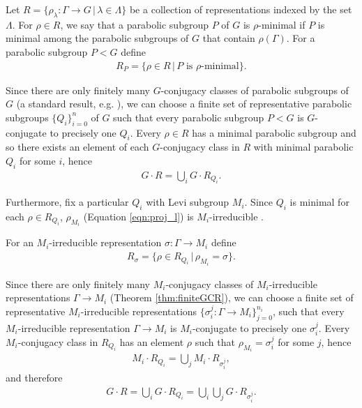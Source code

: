 Let $R = \{ \rho_\lambda : \Gamma \rightarrow G \,|\, \lambda \in \Lambda \}$ be a collection of representations indexed by the set $\Lambda$. For $\rho \in R$, we say that a parabolic subgroup $P$ of $G$ is $\rho$-minimal if $P$ is minimal among the parabolic subgroups of $G$ that contain $\rho(\Gamma)$. For a parabolic subgroup $P < G$ define
\begin{eqnarray*}
  R_P = \{ \rho \in R \,|\, P \textrm{ is } \rho\textrm{-minimal} \}.
\end{eqnarray*}

Since there are only finitely many $G$-conjugacy classes of parabolic subgroups of $G$ (a standard result, e.g. \cite[Theorem 30.1(a)]{humphreys1975linear}), we can choose a finite set of representative parabolic subgroups $\{Q_i\}_{i = 0}^n$ of $G$ such that every parabolic subgroup $P < G$ is $G$-conjugate to precisely one $Q_i$. Every $\rho \in R$ has a minimal parabolic subgroup and so there exists an element of each $G$-conjugacy class in $R$ with minimal parabolic $Q_i$ for some $i$, hence
\begin{eqnarray}
  G \cdot R = \bigcup_i G \cdot R_{Q_i}.
  \label{eqn:gr_gqi}
\end{eqnarray}

Furthermore, fix a particular $Q_i$ with Levi subgroup $M_i$. Since $Q_i$ is minimal for each $\rho \in R_{Q_i}$, $\rho_{M_i}$ (Equation \ref{eqn:proj_l}) is $M_i$-irreducible \cite[Lemma 6.2(ii)]{bate2005geometric}.

For an $M_i$-irreducible representation $\sigma : \Gamma \rightarrow M_i$ define
\begin{eqnarray*}
  R_{\sigma} = \{ \rho \in R_{Q_i} \,|\, \rho_{M_i} = \sigma \}.
\end{eqnarray*}

Since there are only finitely many $M_i$-conjugacy classes of $M_i$-irreducible representations $\Gamma \rightarrow M_i$ (Theorem \ref{thm:finiteGCR}), we can choose a finite set of representative $M_i$-irreducible representations $\{\sigma_i^j : \Gamma \rightarrow M_i \}_{j=0}^{n_i}$, such that every $M_i$-irreducible representation $\Gamma \rightarrow M_i$ is $M_i$-conjugate to precisely one $\sigma_i^j$. Every $M_i$-conjugacy class in $R_{Q_i}$ has an element $\rho$ such that $\rho_{M_i} = \sigma_i^j$ for some $j$, hence
\begin{eqnarray*}
  M_i \cdot R_{Q_i} = \bigcup_j M_i \cdot R_{\sigma_i^j},
\end{eqnarray*}
and therefore
\begin{eqnarray}
  G \cdot R = \bigcup_i G \cdot R_{Q_i} = \bigcup_i \bigcup_j G \cdot R_{\sigma_i^j}.
  \label{eqn:gr_grsigma}
\end{eqnarray}

